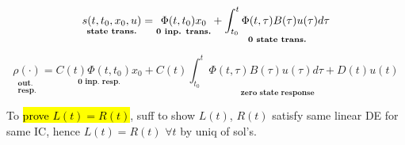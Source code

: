 \begin{Theorem}
\begin{equation*}
\underset{\text{\textbf{state trans.}}}{s(t,t_0,x_0,u)}=\underset{\text{\textbf{0 inp. trans.}}}{\Phi(t,t_0)x_0}+\underset{\text{\textbf{0 state trans.}}}{\int_{t_0}^t\Phi(t,\tau)B(\tau)u(\tau)d\tau}
\end{equation*}
\end{Theorem}
\begin{Theorem}
\begin{equation*}
\underset{\substack{\textbf{out.}\\ \textbf{resp.}}}{\rho(\cdot)}=\underset{\textbf{0 inp. resp.}}{C(t)\Phi(t,t_0)x_0}+\underset{\textbf{zero state response}}{C(t)\int_{t_0}^t\Phi(t,\tau)B(\tau)u(\tau)d\tau+D(t)u(t)}
\end{equation*}
\end{Theorem}
\begin{Proof}
To \hl{prove $L(t)=R(t)$}, suff to show $L(t)$, $R(t)$ satisfy same linear DE for same IC, hence $L(t)=R(t)$ $\forall t$ by uniq of sol's. \QED
\end{Proof}
